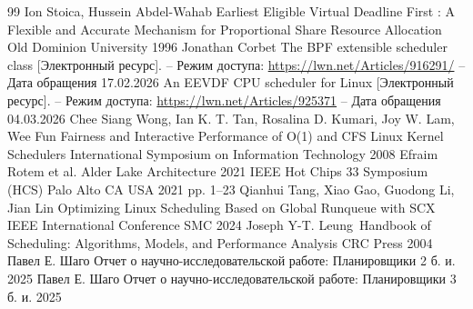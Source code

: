 \documentclass[12pt, oneside]{book}
\begin{document}
\newpage
\renewcommand{\bibname}{\large СПИСОК ИСПОЛЬЗОВАННЫХ ИСТОЧНИКОВ}
\begin{thebibliography}{99}
        \vspace*{0.3cm}
        Ion Stoica, Hussein Abdel-Wahab Earliest Eligible Virtual Deadline First
        : A Flexible and Accurate Mechanism for Proportional Share
        Resource Allocation
        Old Dominion University 1996
        Jonathan Corbet The BPF extensible scheduler class
        [Электронный ресурс].
        -- Режим доступа: \url{https://lwn.net/Articles/916291/} --
        Дата обращения 17.02.2026
        An EEVDF CPU scheduler for Linux [Электронный ресурс].
        -- Режим доступа: \url{https://lwn.net/Articles/925371} --
        Дата обращения 04.03.2026
        Chee Siang Wong, Ian K. T. Tan, Rosalina D. Kumari,
        Joy W. Lam, Wee Fun
        Fairness and Interactive Performance of O(1) and CFS
        Linux Kernel Schedulers
        International Symposium on Information Technology 2008
        Efraim Rotem et al. Alder Lake Architecture
        2021 IEEE Hot Chips 33 Symposium (HCS) Palo Alto CA
        USA 2021 pp. 1--23
        Qianhui Tang, Xiao Gao, Guodong Li, Jian Lin
        Optimizing Linux Scheduling Based on Global Runqueue
        with SCX
        IEEE International Conference SMC 2024
        Joseph Y-T. Leung\ Handbook of Scheduling: Algorithms, Models, and
        Performance Analysis CRC Press 2004
        Павел Е. Шаго Отчет о научно-исследовательской работе:
        Планировщики 2 б. и.
        2025
        Павел Е. Шаго Отчет о научно-исследовательской работе:
        Планировщики 3 б. и.
        2025
\end{thebibliography}
\end{document}

